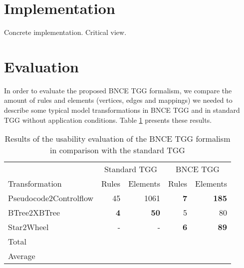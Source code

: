 \documentclass[]{report}
\begin{document}
\section{Implementation}
Concrete implementation. Critical view.

\section{Evaluation}
In order to evaluate the proposed BNCE TGG formalism, we compare the amount of rules and elements (vertices, edges and mappings) we needed to describe some typical model transformations in BNCE TGG and in standard TGG without application conditions. Table \ref{tab:formalism-eval} presents these results.
\begin{table}[h]
	\centering
	\begin{tabular}{l r r r r }
						& \multicolumn{2}{c}{Standard TGG} & \multicolumn{2}{c}{BNCE TGG}\\
		Transformation 			& Rules & Elements 	& Rules & Elements\\
		\hline
		Pseudocode2Controlflow	& 45			& 1061	& \textbf{7}	& \textbf{185} \\
		BTree2XBTree			& \textbf{4}	& \textbf{50}	& 5		& 80 \\
		Star2Wheel				& -				& -		& \textbf{6} 	& \textbf{89} \\
		\hline
		Total					&  & 		&	& \\
		Average					&  & 		&	& \\
	\end{tabular}
	\caption{Results of the usability evaluation of the BNCE TGG formalism in comparison with the standard TGG}
	\label{tab:formalism-eval}
\end{table}
\end{document}
